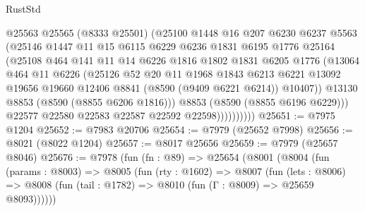 \begin{lexlean}{RustStd}
\begin{coremodule}
                      @25563
                      @25565
                      (@8333 @25501)
                      (@25100
                        @1448
                        @16
                        @207
                        @6230
                        @6237
                        @5563
                        (@25146
                          @1447
                          @11
                          @15
                          @6115
                          @6229
                          @6236
                          @1831
                          @6195
                          @1776
                          @25164
                          (@25108
                            @464
                            @141
                            @11
                            @14
                            @6226
                            @1816
                            @1802
                            @1831
                            @6205
                            @1776
                            (@13064
                              @464
                              @11
                              @6226
                              (@25126
                                @52
                                @20
                                @11
                                @1968
                                @1843
                                @6213
                                @6221
                                @13092
                                @19656
                                @19660
                                @12406
                                @8841
                                (@8590 (@9409 @6221 @6214))
                                @10407))
                            @13130
                            @8853
                            (@8590 (@8855 @6206 @1816)))
                          @8853
                          (@8590 (@8855 @6196 @6229)))
                        @22577
                        @22580
                        @22583
                        @22587
                        @22592
                        @22598))))))))))
@25651 := @7975 @1204
@25652 := @7983 @20706
@25654 := @7979 (@25652 @7998)
@25656 := @8021 (@8022 @1204)
@25657 := @8017 @25656
@25659 := @7979 (@25657 @8046)
@25676 := @7978
    (fun (fn : @89) =>
    @25654
      (@8001
        (@8004
          (fun (params : @8003) =>
          @8005
            (fun (rty : @1602) =>
            @8007
              (fun (lets : @8006) =>
              @8008 (fun (tail : @1782) => @8010 (fun (Γ : @8009) => @25659 @8093))))))

\end{coremodule}
\end{lexlean}
